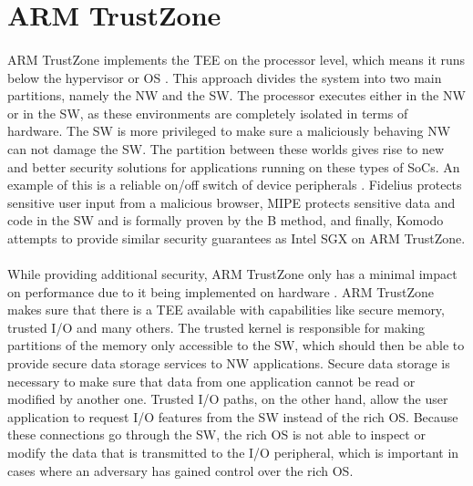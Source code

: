 \section{ARM TrustZone}

\paragraph*{}
ARM TrustZone \cite{TrustZone} implements the TEE on the processor level, which means it runs below the hypervisor or OS \cite{PintoSandro2019DATA}. This approach divides the system into two main partitions, namely the NW and the SW. The processor executes either in the NW or in the SW, as these environments are completely isolated in terms of hardware. The SW is more privileged to make sure a maliciously behaving NW can not damage the SW. The partition between these worlds gives rise to new and better security solutions for applications running on these types of SoCs. An example of this is a reliable on/off switch of device peripherals \cite{LentzMatthew2018SATM}. Fidelius \cite{EskandarianSaba2018FPUS} protects sensitive user input from a malicious browser, MIPE \cite{ChangRui2017Mapm} protects sensitive data and code in the SW and is formally proven by the B method, and finally, Komodo \cite{FerraiuoloAndrew2017KUvt} attempts to provide similar security guarantees as Intel SGX on ARM TrustZone.  

\paragraph*{}
While providing additional security, ARM TrustZone only has a minimal impact on performance due to it being implemented on hardware \cite{AmacherJulien2019Otpo} \cite{HuaZhichao2021Tpcf}. ARM TrustZone makes sure that there is a TEE available with capabilities like secure memory, trusted I/O and many others. The trusted kernel is responsible for making partitions of the memory only accessible to the SW, which should then be able to provide secure data storage services to NW applications. Secure data storage is necessary to make sure that data from one application cannot be read or modified by another one. Trusted I/O paths, on the other hand, allow the user application to request I/O features from the SW instead of the rich OS. Because these connections go through the SW, the rich OS is not able to inspect or modify the data that is transmitted to the I/O peripheral, which is important in cases where an adversary has gained control over the rich OS.

